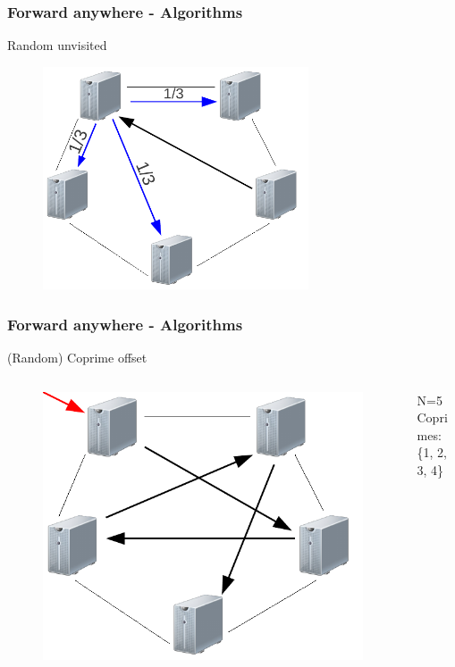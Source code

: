 \documentclass[compress]{beamer}
\begin{document}
\begin{frame}
\frametitle{Forward anywhere - Algorithms}
\begin{centering}
Random unvisited
\begin{figure}[h!tb]
 \includegraphics[width=0.7\textwidth]{../resources/p_randunvisited.pdf}
 \end{figure}
\end{centering}
\end{frame}

\begin{frame}
\frametitle{Forward anywhere - Algorithms}
\begin{centering}
(Random) Coprime offset
\begin{columns}
\begin{column}{0.7\textwidth}
\begin{figure}[h!tb]
 \includegraphics[width=\textwidth]{../resources/p_coprime.pdf}
 \end{figure}
\end{column}
\begin{column}{0.3\textwidth}
N=5 \\
Coprimes:\\
\{1, 2, 3, 4\}

\end{column}
\end{columns}
\end{centering}
\end{frame}
\end{document}
